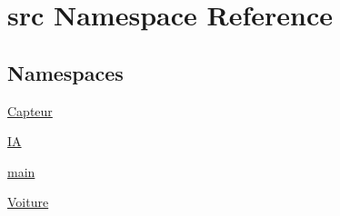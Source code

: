 \hypertarget{namespacesrc}{}\section{src Namespace Reference}
\label{namespacesrc}
\subsection*{Namespaces}
\begin{DoxyCompactItemize}
\item 
 \hyperlink{namespacesrc_1_1_capteur}{Capteur}
\item 
 \hyperlink{namespacesrc_1_1_i_a}{IA}
\item 
 \hyperlink{namespacesrc_1_1main}{main}
\item 
 \hyperlink{namespacesrc_1_1_voiture}{Voiture}
\end{DoxyCompactItemize}
